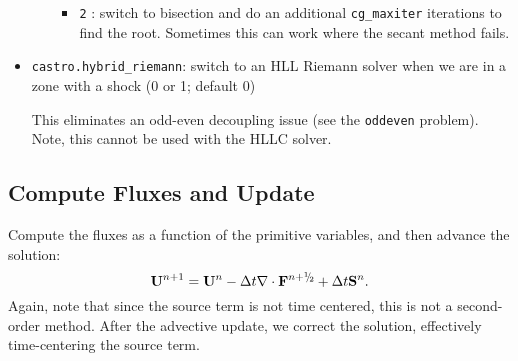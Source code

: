 \begin{itemize}
\begin{itemize}
\begin{itemize}
     \item {\tt 2} : switch to bisection and do an additional {\tt cg\_maxiter}
       iterations to find the root.  Sometimes this can work where the 
       secant method fails.
     \end{itemize}
  \end{itemize}

\item {\tt castro.hybrid\_riemann}: switch to an HLL Riemann solver when we are
  in a zone with a shock (0 or 1; default 0)

  This eliminates an odd-even decoupling issue (see the {\tt oddeven}
  problem).  Note, this cannot be used with the HLLC solver.
  
\end{itemize}




\subsection{Compute Fluxes and Update}

Compute the fluxes as a function of the primitive variables, and then
advance the solution:
\begin{equation}
\Ub^{n+1} = \Ub^n - \dt\nabla\cdot\Fb^\nph + \dt\Sb^n.
\end{equation}
Again, note that since the source term is not time centered, this is
not a second-order method.  After the advective update, we correct the
solution, effectively time-centering the source term.
